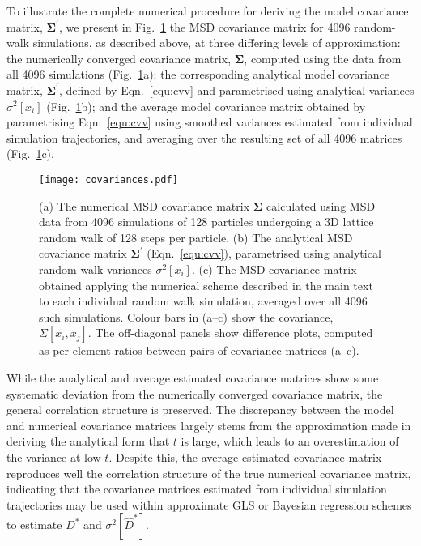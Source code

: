 \documentclass[reprint,superscriptaddress,nobibnotes,amsmath,amssymb,aps,prx,hidelinks,linenumbers]{revtex4-2}
\newcommand{\oMSDi}{\ensuremath{x_i}}
\newcommand{\oMSDj}{\ensuremath{x_j}}
\newcommand{\Dest}{\ensuremath{\widehat{D}^*}}
\newcommand{\D}{\ensuremath{D^*}}
\newcommand{\var}[1]{\ensuremath{\sigma^2[#1]}}
\begin{document}
To illustrate the complete numerical procedure for deriving the model covariance matrix, $\bm{\Sigma^\prime}$, we present in Fig.~\ref{fig:covariances} the MSD covariance matrix for \num{4096} random-walk simulations, as described above, at three differing levels of approximation:
the numerically converged covariance matrix, $\bm{\Sigma}$, computed using the data from all \num{4096} simulations (Fig.~\ref{fig:covariances}a);
the corresponding analytical model covariance matrix, $\mathbf{\Sigma^\prime}$, defined by Eqn.~\ref{equ:cvv} and parametrised using analytical variances $\var{\oMSDi}$ (Fig.~\ref{fig:covariances}b); and the average model covariance matrix obtained by parametrising Eqn.~\ref{equ:cvv} using smoothed variances estimated from individual simulation trajectories, and averaging over the resulting set of all \num{4096} matrices (Fig.~\ref{fig:covariances}c).
%
\begin{figure}
    \centering
    \texttt{[image: covariances.pdf]}
    \caption{
        (a) The numerical MSD covariance matrix $\bm{\Sigma}$ calculated using MSD data from \num{4096} simulations of \num{128} particles undergoing a 3D lattice random walk of \num{128} steps per particle.
        (b) The analytical MSD covariance matrix $\bm{\Sigma^\prime}$ (Eqn.~\ref{equ:cvv}), parametrised using analytical random-walk variances $\var{\oMSDi}$.
        (c) The MSD covariance matrix obtained applying the numerical scheme described in the main text to each individual random walk simulation, averaged over all \num{4096} such simulations.
        Colour bars in (a--c) show the covariance, $\Sigma\left[\oMSDi, \oMSDj\right]$.
        The off-diagonal panels show difference plots, computed as per-element ratios between pairs of covariance matrices (a--c).
    }
    \label{fig:covariances}
\end{figure}
%

While the analytical and average estimated covariance matrices show some systematic deviation from the numerically converged covariance matrix, the general correlation structure is preserved.
The discrepancy between the model and numerical covariance matrices largely stems from the approximation made in deriving the analytical form that $t$ is large, which leads to an overestimation of the variance at low $t$.
Despite this, the average estimated covariance matrix reproduces well the correlation structure of the true numerical covariance matrix, indicating that the covariance matrices estimated from individual simulation trajectories may be used within approximate GLS or Bayesian regression schemes to estimate $\D$ and $\var{\Dest}$.
\end{document}
